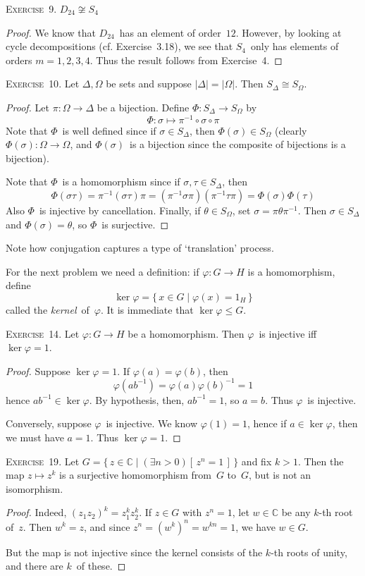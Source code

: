 \documentclass[letterpaper]{article}
\newcommand{\exercise}[1]{\goodbreak\noindent\textsc{Exercise~{#1}.}}
\newcommand{\C}{\mathbb{C}}
\newcommand{\iso}{\cong}
\newcommand{\ord}[1]{|{#1}|}
\begin{document}
\exercise{9}
$D_{24}\not\iso S_4$
\begin{proof}
We know that $D_{24}$~has an element of order~$12$. However, by looking at cycle decompositions (cf. Exercise~3.18), we see that $S_4$~only has elements of orders $m=1,2,3,4$. Thus the result follows from Exercise~4.
\end{proof}

\exercise{10}
Let $\Delta,\Omega$ be sets and suppose $\ord{\Delta}=\ord{\Omega}$. Then $S_{\Delta}\iso S_{\Omega}$.
\begin{proof}
Let $\pi:\Omega\to\Delta$ be a bijection. Define $\Phi:S_{\Delta}\to S_{\Omega}$ by
$$\Phi:\sigma\mapsto\pi^{-1}\circ\sigma\circ\pi$$
Note that $\Phi$~is well defined since if $\sigma\in S_{\Delta}$, then $\Phi(\sigma)\in S_{\Omega}$ (clearly $\Phi(\sigma):\Omega\to\Omega$, and $\Phi(\sigma)$~is a bijection since the composite of bijections is a bijection).

Note that $\Phi$~is a homomorphism since if $\sigma,\tau\in S_{\Delta}$, then
$$\Phi(\sigma\tau)=\pi^{-1}(\sigma\tau)\pi=(\pi^{-1}\sigma\pi)(\pi^{-1}\tau\pi)=\Phi(\sigma)\Phi(\tau)$$
Also $\Phi$~is injective by cancellation. Finally, if $\theta\in S_{\Omega}$, set $\sigma=\pi\theta\pi^{-1}$. Then $\sigma\in S_{\Delta}$ and $\Phi(\sigma)=\theta$, so $\Phi$~is surjective.
\end{proof}
\noindent Note how conjugation captures a type of `translation' process.

For the next problem we need a definition: if $\varphi:G\to H$ is a homomorphism, define
$$\ker\varphi=\{\,x\in G\mid \varphi(x)=1_H\,\}$$
called the \emph{kernel}~of~$\varphi$. It is immediate that $\ker\varphi\le G$.

\bigskip
\exercise{14}
Let $\varphi:G\to H$ be a homomorphism. Then $\varphi$~is injective iff $\ker\varphi=1$.
\begin{proof}
Suppose $\ker\varphi=1$. If $\varphi(a)=\varphi(b)$, then
$$\varphi(ab^{-1})=\varphi(a)\varphi(b)^{-1}=1$$
hence $ab^{-1}\in\ker\varphi$. By hypothesis, then, $ab^{-1}=1$, so $a=b$. Thus $\varphi$~is injective.

Conversely, suppose $\varphi$~is injective. We know $\varphi(1)=1$, hence if $a\in\ker\varphi$, then we must have $a=1$. Thus $\ker\varphi=1$.
\end{proof}

\exercise{19}
Let $G=\{\,z\in\C\mid (\exists n>0)[\,z^n=1\,]\,\}$ and fix $k>1$. Then the map $z\mapsto z^k$ is a surjective homomorphism from~$G$ to~$G$, but is not an isomorphism.
\begin{proof}
Indeed, $(z_1z_2)^k=z_1^k z_2^k$. If $z\in G$ with $z^n=1$, let $w\in\C$ be any $k$-th root of~$z$. Then $w^k=z$, and since $z^n=(w^k)^n=w^{kn}=1$, we have $w\in G$.

But the map is not injective since the kernel consists of the $k$-th roots of unity, and there are $k$~of these.
\end{proof}
\end{document}
